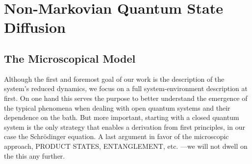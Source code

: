 \chapter{Non-Markovian Quantum State Diffusion}
\label{chap:nmqsd}



\section{The Microscopical Model}
\label{sec:nmqsd.model}
%

Although the first and foremost goal of our work is the description of the system's reduced dynamics, we focus on a full system-environment description at first.
On one hand this serves the purpose to better understand the emergence of the typical phenomena when dealing with open quantum systems and their dependence on the bath.
But more important, starting with a closed quantum system is the only strategy that enables a derivation from first principles, in our case the Schrödinger equation.
A last argument in favor of the microscopic approach, PRODUCT STATES, ENTANGLEMENT, etc. ---we will not dwell on the this any further.\\


